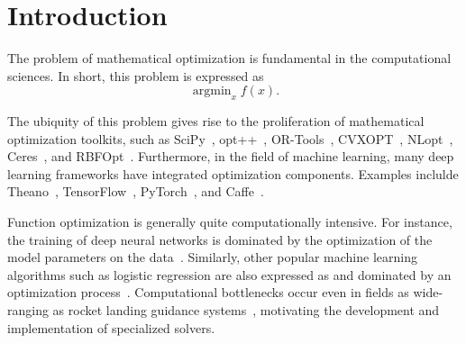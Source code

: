 \section{Introduction}
\label{sec:introduction}

The problem of mathematical optimization is fundamental in the computational
sciences.  In short, this problem is expressed as
%
\begin{equation}
\operatorname{argmin}_x f(x).
\end{equation}

The ubiquity of this problem gives rise to the proliferation of mathematical
optimization toolkits, such as SciPy~\cite{2019arXiv190710121V},
opt++~\cite{meza1994opt++},
OR-Tools~\cite{ortools}, CVXOPT~\cite{vandenberghe2010cvxopt},
NLopt~\cite{johnson2014nlopt}, Ceres~\cite{ceres-solver},
and RBFOpt~\cite{costa2018rbfopt}.
Furthermore, in the field of machine learning, many
deep learning frameworks have integrated optimization
components.  Examples inclulde Theano~\cite{2016arXiv160502688full},
TensorFlow~\cite{tensorflow2015-whitepaper}, PyTorch~\cite{NEURIPS2019_9015},
and Caffe~\cite{jia2014caffe}.

Function optimization is generally quite computationally intensive.
For instance, the training of deep neural networks is dominated by
the optimization of the model parameters on the
data~\cite{krizhevsky2012imagenet, lauzon2012introduction}.  Similarly,
other popular machine learning algorithms such as logistic regression are also
expressed as and dominated by an optimization process~\cite{zhang2004solving,
manogaran2018health}.  Computational bottlenecks occur even in fields as
wide-ranging as rocket landing guidance systems~\cite{dueri2016customized},
motivating the development and implementation of specialized solvers.

